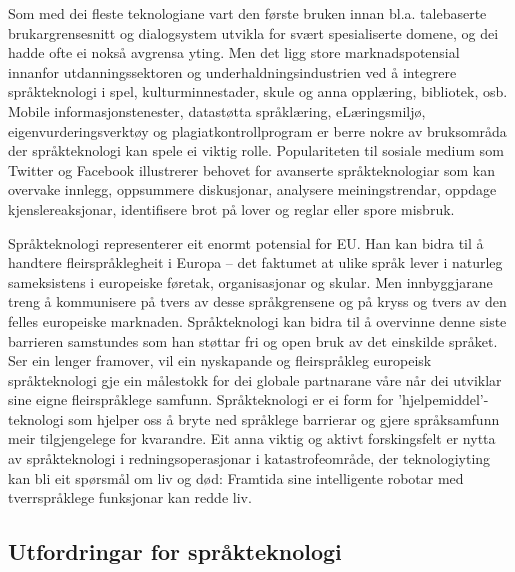 \begin{multicols}{2}
Som med dei fleste teknologiane vart den første bruken innan bl.a. talebaserte brukargrensesnitt og dialogsystem utvikla for svært spesialiserte domene, og dei hadde ofte ei nokså avgrensa yting. Men det ligg store marknadspotensial innanfor utdanningssektoren og underhaldningsindustrien ved å integrere språkteknologi i spel, kulturminnestader, skule og anna opplæring, bibliotek, osb. Mobile informasjonstenester, datastøtta språklæring, eLæringsmiljø, eigenvurderingsverktøy og plagiatkontrollprogram er berre nokre av bruksområda der språkteknologi kan spele ei viktig rolle. Populariteten til sosiale medium som Twitter og Facebook illustrerer behovet for avanserte språkteknologiar som kan overvake innlegg, oppsummere diskusjonar, analysere meiningstrendar, oppdage kjenslereaksjonar, identifisere brot på lover og reglar eller spore misbruk.


Språkteknologi representerer eit enormt potensial for EU. Han kan bidra til å handtere fleirspråklegheit i Europa – det faktumet at ulike språk lever i naturleg sameksistens i europeiske føretak, organisasjonar og skular. Men innbyggjarane treng å kommunisere på tvers av desse språkgrensene og på kryss og tvers av den felles europeiske marknaden. Språkteknologi kan bidra til å overvinne denne siste barrieren samstundes som han støttar fri og open bruk av det einskilde språket. Ser ein lenger framover, vil ein nyskapande og fleirspråkleg europeisk språkteknologi gje ein målestokk for dei globale partnarane våre når dei utviklar sine eigne fleirspråklege samfunn. Språkteknologi er ei form for 'hjelpemiddel'-teknologi som hjelper oss å bryte ned språklege barrierar og gjere språksamfunn meir tilgjengelege for kvarandre. 
Eit anna viktig og aktivt forskingsfelt er nytta av språkteknologi i redningsoperasjonar i katastrofeområde, der teknologiyting kan bli eit spørsmål om liv og død: Framtida sine intelligente robotar med tverrspråklege funksjonar kan redde liv. 
 
\subsection{Utfordringar for språkteknologi}


\end{multicols}
